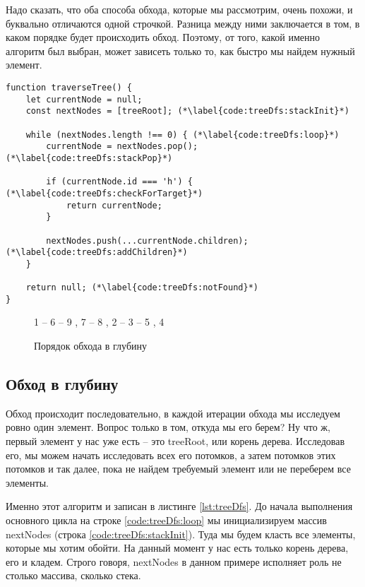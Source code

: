 \documentclass[../../article]{subfiles}
\begin{document}
Надо сказать, что оба способа обхода, которые мы рассмотрим, очень похожи, и буквально отличаются одной строчкой. Разница между ними заключается в том, в каком порядке будет происходить обход. Поэтому, от того, какой именно алгоритм был выбран, может зависеть только то, как быстро мы найдем нужный элемент.

\begin{figure*}
    \begin{ruledelement}
        \begin{lstlisting}[caption={Обход дерева в глубину}, label={lst:treeDfs}]
function traverseTree() {
    let currentNode = null;
    const nextNodes = [treeRoot]; (*\label{code:treeDfs:stackInit}*)

    while (nextNodes.length !== 0) { (*\label{code:treeDfs:loop}*)
        currentNode = nextNodes.pop(); (*\label{code:treeDfs:stackPop}*)

        if (currentNode.id === 'h') { (*\label{code:treeDfs:checkForTarget}*)
            return currentNode;
        }

        nextNodes.push(...currentNode.children); (*\label{code:treeDfs:addChildren}*)
    }

    return null; (*\label{code:treeDfs:notFound}*)
}
        \end{lstlisting}
    \end{ruledelement}
\end{figure*}

\begin{figure}
    \styledgraph
    {
        1 -- { 6 -- { 9 , 7 -- 8 }, 2 -- 3 -- { 5 , 4 }}
    }
    \caption{Порядок обхода в глубину}
    \label{fig:treeDfsOrder}
\end{figure}

\subsection{Обход в глубину}

Обход происходит последовательно, в каждой итерации обхода мы исследуем ровно один элемент. Вопрос только в том, откуда мы его берем? Ну что ж, первый элемент у нас уже есть – это {\firacodebold treeRoot}, или корень дерева. Исследовав его, мы можем начать исследовать всех его потомков, а затем потомков этих потомков и так далее, пока не найдем требуемый элемент или не переберем все элементы.

Именно этот алгоритм и записан в листинге \ref{lst:treeDfs}. До начала выполнения основного цикла на строке \ref{code:treeDfs:loop} мы инициализируем массив {\firacodebold nextNodes} (строка \ref{code:treeDfs:stackInit}). Туда мы будем класть все элементы, которые мы хотим обойти. На данный момент у нас есть только корень дерева, его и кладем. Строго говоря, {\firacodebold nextNodes} в данном примере исполняет роль не столько массива, сколько {\firacodebold стека}.
\end{document}

